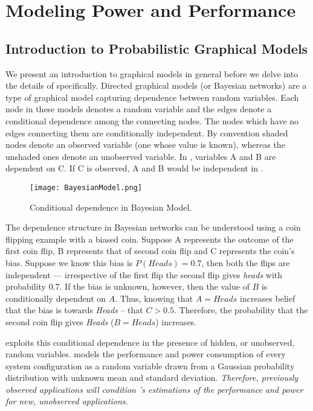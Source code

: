 \section{Modeling Power and Performance}
\label{sec:HBN}


\subsection{Introduction to Probabilistic Graphical Models}
We present an introduction to graphical models in general before we
delve into the details of \SYSTEM{} specifically. Directed graphical
models (or Bayesian networks) are a type of graphical model capturing
dependence between random variables.  Each node in these models
denotes a random variable and the edges denote a conditional
dependence among the connecting nodes. The nodes which have no edges
connecting them are conditionally independent.  By convention shaded
nodes denote an observed variable (\ie one whose value is known),
whereas the unshaded ones denote an unobserved variable. In
, variables A and B are dependent on C.  If C is
observed, A and B would be independent in .


\begin{figure}
\begin{center}
	 \texttt{[image: BayesianModel.png]}
\end{center}
\vspace{-0.35em}
\caption{Conditional dependence in Bayesian Model.}
\label{fig:BN}
\end{figure}

The dependence structure in Bayesian networks can be understood using
a coin flipping example with a biased coin.  Suppose A represents the
outcome of the first coin flip, B represents that of second coin flip
and C represents the coin's bias.  Suppose we know this bias is
$P(Heads) = 0.7$, then both the flips are independent --- irrespective
of the first flip the second flip gives \textit{heads} with
probability $0.7$. If the bias is unknown, however, then the value of
$B$ is conditionally dependent on $A$.  Thus, knowing that $A = Heads$
increases belief that the bias is towards \textit{Heads} -- that $C >
0.5$.  Therefore, the probability that the second coin flip gives
\textit{Heads} (\ie $B = Heads$) increases.

\SYSTEM{} exploits this conditional dependence in the presence of
hidden, or unobserved, random variables.  \SYSTEM{} models the
performance and power consumption of every system configuration as a
random variable drawn from a Gaussian probability distribution with
unknown mean and standard deviation.  \emph{Therefore, previously
  observed applications will condition \SYSTEM{}'s estimations of the
  performance and power for new, unobserved applications.}  

